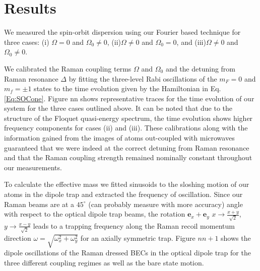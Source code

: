 \section{Results}

We measured the spin-orbit dispersion using our Fourier based technique  for three cases: (i) $\Omega=0$ and $\Omega_0\neq0$, (ii)$\Omega\neq0$ and $\Omega_0=0$, and (iii)$\Omega\neq0$ and $\Omega_0\neq0$. 


We calibrated the Raman coupling terms $\Omega$ and $\Omega_0$ and the detuning from Raman resonance $\Delta$ by fitting the three-level Rabi oscillations of the $m_F=0$ and $m_f=\pm 1$ states to the time evolution given by the Hamiltonian in Eq. \ref{Eq:SOCone}. Figure nn shows representative traces for the time evolution of our system for the three cases outlined above. It can be noted that due to the structure of the Floquet quasi-energy spectrum, the time evolution shows higher frequency components for cases (ii) and (iii). These calibrations along with the information gained from the images of atoms out-coupled  with microwaves guaranteed that we were indeed at the correct detuning from Raman resonance and that the Raman coupling strength remained nominally constant throughout our measurements. 

To calculate the effective mass we fitted sinusoids to the sloshing motion of our atoms in the dipole trap and extracted the frequency of oscillation. Since our Raman beams are at a $45^{\circ}$ (can probably measure with more accuracy) angle with respect to the optical dipole trap beams, the rotation $\mathbf{e}_x+\mathbf{e}_y$   $x\rightarrow\frac{x+y}{\sqrt{2}}$, $y\rightarrow\frac{x-y}{\sqrt{2}}$ leads to a trapping frequency along the Raman recoil momentum direction
$\omega=\sqrt{\omega_x^2+\omega_y^2}$ for an axially symmetric trap.  
Figure $nn+1$ shows the dipole oscillations of the Raman dressed BECs in the optical dipole trap for the three different coupling regimes as well as the bare state motion. 



